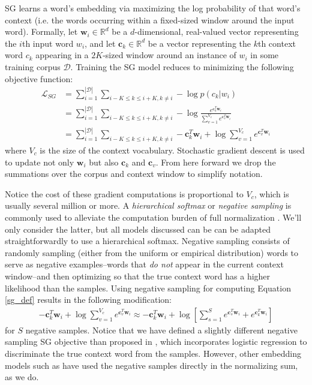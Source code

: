 \documentclass{article} %
\begin{document}
SG learns a word's embedding via maximizing the log probability of that word's context (i.e. the words occurring within a fixed-sized window around the input word).  Formally, let $\mathbf{w}_{i} \in \mathbb{R}^{d}$ be a $d$-dimensional, real-valued vector representing the $i$th input word $w_{i}$, and let $\mathbf{c}_{k} \in \mathbb{R}^{d}$ be a vector representing the $k$th context word $c_{k}$ appearing in a $2K$-sized window around an instance of $w_{i}$ in some training corpus $\mathcal{D}$.  Training the SG model reduces to minimizing the following objective function: \begin{equation}\begin{split}\label{sg_def} \mathcal{L}_{SG} &= \sum_{i=1}^{|\mathcal{D}|} \sum_{i-K\le k \le i+K, k\ne i} - \log p(c_{k} | w_{i}) \\ &= \sum_{i=1}^{|\mathcal{D}|} \sum_{i-K\le k \le i+K, k\ne i} - \log \frac{e^{\mathbf{c}_{k}^{T}\mathbf{w}_{i}}}{\sum_{v=1}^{V_{c}} e^{\mathbf{c}_{v}^{T}\mathbf{w}_{i}}} \\ &= \sum_{i=1}^{|\mathcal{D}|} \sum_{i-K\le k \le i+K, k\ne i} - \mathbf{c}_{k}^{T}\mathbf{w}_{i} + \log \sum_{v=1}^{V_{c}} e^{\mathbf{c}_{v}^{T}\mathbf{w}_{i}} \end{split}\end{equation} where $V_{c}$ is the size of the context vocabulary.  Stochastic gradient descent is used to update not only $\mathbf{w}_{i}$ but also $\mathbf{c}_{k}$ and $\mathbf{c}_{v}$.  From here forward we drop the summations over the corpus and context window to simplify notation.

Notice the cost of these gradient computations is proportional to $V_{c}$, which is usually several million or more.  A \textit{hierarchical softmax} or \textit{negative sampling} is commonly used to alleviate the computation burden of full normalization \citep{mikolov2013distributed}.  We'll only consider the latter, but all models discussed can be can be adapted straightforwardly to use a hierarchical softmax.  Negative sampling consists of randomly sampling (either from the uniform or empirical distribution) words to serve as negative examples--words that \textit{do not} appear in the current context window--and then optimizing so that the true context word has a higher likelihood than the samples.  Using negative sampling for computing Equation \ref{sg_def} results in the following modification:  \begin{equation}\begin{split}\label{sg_w_neg} - \mathbf{c}_{k}^{T}\mathbf{w}_{i} + \log \sum_{v=1}^{V_{c}} e^{\mathbf{c}_{v}^{T}\mathbf{w}_{i}} \approx -\mathbf{c}_{k}^{T}\mathbf{w}_{i} + \log  \left [ \sum_{s=1}^{S} e^{\mathbf{c}_{s}^{T} \mathbf{w}_{i}} + e^{\mathbf{c}_{k}^{T} \mathbf{w}_{i}} \right ] \end{split}\end{equation} for $S$ negative samples.  Notice that we have defined a slightly different negative sampling SG objective than proposed in \cite{mikolov2013distributed}, which incorporates logistic regression to discriminate the true context word from the samples.  However, other embedding models such as \cite{huang2013learning} have used the negative samples directly in the normalizing sum, as we do.  
\end{document}
